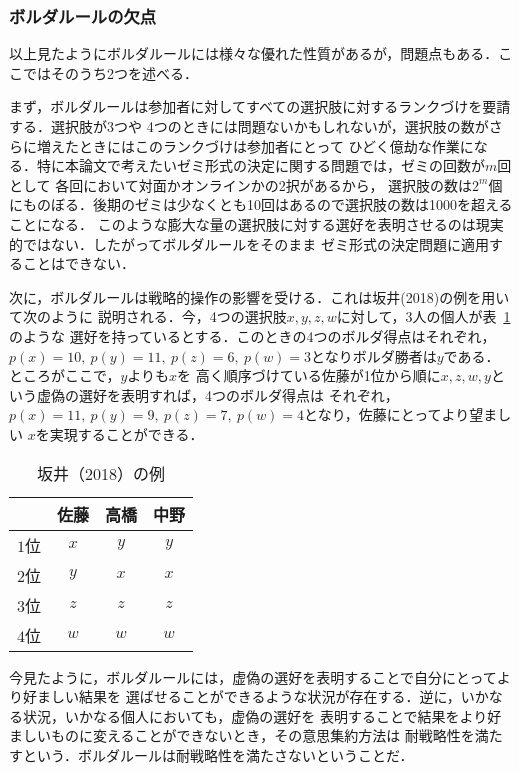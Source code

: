 \documentclass[dvipdfmx]{jsarticle}
\begin{document}
\subsubsection{ボルダルールの欠点}\label{ボルダルールの欠点}
以上見たようにボルダルールには様々な優れた性質があるが，問題点もある．ここではそのうち2つを述べる．

まず，ボルダルールは参加者に対してすべての選択肢に対するランクづけを要請する．選択肢が3つや
4つのときには問題ないかもしれないが，選択肢の数がさらに増えたときにはこのランクづけは参加者にとって
ひどく億劫な作業になる．特に本論文で考えたいゼミ形式の決定に関する問題では，ゼミの回数が$m$回として
各回において対面かオンラインかの2択があるから，
選択肢の数は$2^m$個にものぼる．後期のゼミは少なくとも10回はあるので選択肢の数は1000を超えることになる．
このような膨大な量の選択肢に対する選好を表明させるのは現実的ではない．したがってボルダルールをそのまま
ゼミ形式の決定問題に適用することはできない．

次に，ボルダルールは戦略的操作の影響を受ける．これは坂井(2018)の例を用いて次のように
説明される．今，4つの選択肢$x,y,z,w$に対して，3人の個人が表~\ref{Sakai2018}のような
選好を持っているとする．このときの4つのボルダ得点はそれぞれ，$p(x) = 10,\ p(y) = 11,
\ p(z) = 6, \ p(w) = 3$となりボルダ勝者は$y$である．ところがここで，$y$よりも$x$を
高く順序づけている佐藤が1位から順に$x,z,w,y$という虚偽の選好を表明すれば，4つのボルダ得点は
それぞれ，$p(x) = 11,\ p(y) = 9,\ p(z) = 7, \ p(w) = 4$となり，佐藤にとってより望ましい
$x$を実現することができる．

\begin{table}[h]
  \caption{坂井（2018）の例}\label{Sakai2018}
  \begin{center}
    \begin{tabular}{c|c|c|c} \hline
        & 佐藤 & 高橋 & 中野 \\ \hline
      $1$位 & $x$ & $y$ & $y$ \\
      $2$位 & $y$ & $x$ & $x$ \\
      $3$位 & $z$ & $z$ & $z$ \\
      $4$位 & $w$ & $w$ & $w$ \\ \hline
    \end{tabular}
  \end{center}
\end{table}

今見たように，ボルダルールには，虚偽の選好を表明することで自分にとってより好ましい結果を
選ばせることができるような状況が存在する．逆に，いかなる状況，いかなる個人においても，虚偽の選好を
表明することで結果をより好ましいものに変えることができないとき，その意思集約方法は
耐戦略性を満たすという．ボルダルールは耐戦略性を満たさないということだ．
\end{document}
